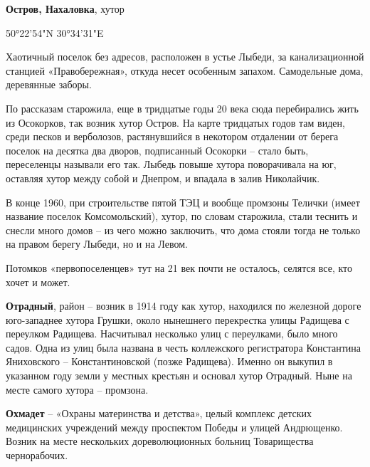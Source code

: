 \medskip

\textbf{Остров, Нахаловка}, хутор

50°22'54"N 30°34'31"E

Хаотичный поселок без адресов, расположен в устье Лыбеди, за канализационной станцией «Правобережная», откуда несет особенным запахом. Самодельные дома, деревянные заборы.

По рассказам старожила, еще в тридцатые годы 20 века сюда перебирались жить из Осокорков, так возник хутор Остров. На карте тридцатых годов там виден, среди песков и верболозов, растянувшийся в некотором отдалении от берега поселок на десятка два дворов, подписанный Осокорки – стало быть, переселенцы называли его так. Лыбедь повыше хутора поворачивала на юг, оставляя хутор между собой и Днепром, и впадала в залив Николайчик. 

В конце 1960, при строительстве пятой ТЭЦ и вообще промзоны Телички (имеет название поселок Комсомольский), хутор, по словам старожила, стали теснить и снесли много домов – из чего можно заключить, что дома стояли тогда не только на правом берегу Лыбеди, но и на Левом.

Потомков «первопоселенцев» тут на 21 век почти не осталось, селятся все, кто хочет и может.\\

\medskip


\textbf{Отрадный}, район – возник в 1914 году как хутор, находился по железной дороге юго-запад\-нее хутора Грушки, около нынешнего перекрестка улицы Радищева с переулком Радищева. Насчитывал несколько улиц с переулками, было много садов. Одна из улиц была названа в честь коллежского регистратора Константина Яниховского – Константиновской (позже Радищева). Именно он выкупил в указанном году земли у местных крестьян и основал хутор Отрадный. Ныне на месте самого хутора – промзона.\\


\medskip

\textbf{Охмадет} – «Охраны материнства и детства», целый комплекс детских медицинских учреждений между проспектом Победы и улицей Андрющенко. Возник на месте нескольких дореволюционных больниц Товарищества чернорабочих.\\


